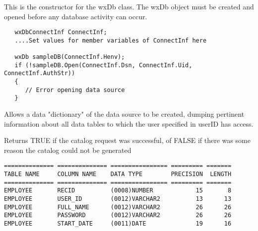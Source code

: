


This is the constructor for the wxDb class.  The wxDb object must
be created and opened before any database activity can occur.

\begin{verbatim}
   wxDbConnectInf ConnectInf;
   ....Set values for member variables of ConnectInf here

   wxDb sampleDB(ConnectInf.Henv);
   if (!sampleDB.Open(ConnectInf.Dsn, ConnectInf.Uid, ConnectInf.AuthStr))
   {
      // Error opening data source
   }
\end{verbatim}


\label{wxdbcatalog}


Allows a data "dictionary" of the data source to be created, dumping pertinent information about all data tables to which the user specified in userID has access. 





Returns TRUE if the catalog request was successful, of FALSE if there was some reason the catalog could not be generated

\begin{verbatim}
============== ============== ================ ========= =======
TABLE NAME     COLUMN NAME    DATA TYPE        PRECISION  LENGTH
============== ============== ================ ========= =======
EMPLOYEE       RECID          (0008)NUMBER            15       8
EMPLOYEE       USER_ID        (0012)VARCHAR2          13      13
EMPLOYEE       FULL_NAME      (0012)VARCHAR2          26      26
EMPLOYEE       PASSWORD       (0012)VARCHAR2          26      26
EMPLOYEE       START_DATE     (0011)DATE              19      16
\end{verbatim}


\label{wxdbclose}

